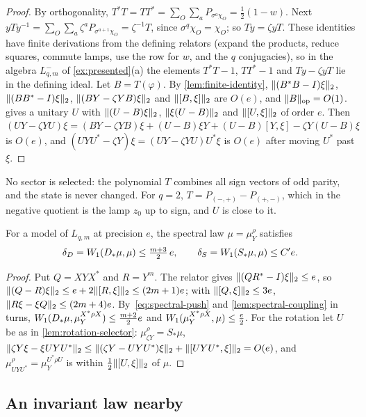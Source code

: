 \begin{proof}
By orthogonality, $T^*T=TT^*=\sum_O\sum_aP_{\sigma^a\chi_O}=\frac12(1-w)$. Next $yTy^{-1}=\sum_O\sum_a\zeta^aP_{\sigma^{a+1}\chi_O}=
\zeta^{-1}T$, since $\sigma^q\chi_O=\chi_O$; so $Ty=\zeta yT$. These identities have finite derivations from the defining
relators (expand the products, reduce squares, commute lamps, use the row for $w$, and the $q$ conjugacies), so in the
algebra $L_{q,m}^-$ of \cref{ex:presented}(a) the elements $T^*T-1$, $TT^*-1$ and $Ty-\zeta yT$ lie in the defining ideal.
Let $B=T(\varphi)$. By \cref{lem:finite-identity}, $\lVert (B^*B-I)\xi\rVert_2$, $\lVert (BB^*-I)\xi\rVert_2$, $\lVert (BY-\zeta YB)\xi\rVert_2$ and
$\lVert [B,\xi]\rVert_2$ are $O(e)$, and $\lVert B\rVert_{\mathrm{op}}=O(1)$.  gives a unitary $U$ with $\lVert (U-B)\xi\rVert_2$, $\lVert \xi(U-B)\rVert_2$ and
$\lVert [U,\xi]\rVert_2$ of order $e$. Then $(UY-\zeta YU)\xi=(BY-\zeta YB)\xi+(U-B)\xi Y+(U-B)[Y,\xi]-\zeta Y(U-B)\xi$ is $O(e)$, and
$(UYU^*-\zeta Y)\xi=(UY-\zeta YU)U^*\xi$ is $O(e)$ after moving $U^*$ past $\xi$.
\end{proof}

No sector is selected: the polynomial $T$ combines all sign vectors of odd parity, and the state is never changed. For
$q=2$, $T=P_{(-,+)}-P_{(+,-)}$, which in the negative quotient is the lamp $z_0$ up to sign, and $U$ is close to it.

\begin{lemma}\label{lem:invariances}
For a model of $L_{q,m}$ at precision $e$, the spectral law $\mu=\mu^\rho_Y$ satisfies
\[
\delta_D=W_1(D_*\mu,\mu)\le\tfrac{m+3}2\,e,\qquad\delta_S=W_1(S_*\mu,\mu)\le C'e .
\]
\end{lemma}

\begin{proof}
Put $Q=XYX^*$ and $R=Y^m$. The relator gives $\lVert (QR^*-I)\xi\rVert_2\le e$, so $\lVert (Q-R)\xi\rVert_2\le e+2\lVert [R,\xi]\rVert_2\le(2m+1)e$; with
$\lVert [Q,\xi]\rVert_2\le3e$, $\lVert R\xi-\xi Q\rVert_2\le(2m+4)e$. By~\eqref{eq:spectral-push} and \cref{lem:spectral-coupling} in turns,
$W_1(D_*\mu,\mu^{X^*\rho X}_Y)\le\frac{m+2}2e$ and $W_1(\mu^{X^*\rho X}_Y,\mu)\le\frac e2$. For the rotation let $U$ be as in
\cref{lem:rotation-selector}: $\mu^\rho_{\zeta Y}=S_*\mu$, $\lVert \zeta Y\xi-\xi UYU^*\rVert_2\le\lVert (\zeta Y-UYU^*)\xi\rVert_2+\lVert [UYU^*,\xi]\rVert_2=
O(e)$, and $\mu^\rho_{UYU^*}=\mu^{U^*\rho U}_Y$ is within $\frac12\lVert [U,\xi]\rVert_2$ of $\mu$.
\end{proof}

\subsection{An invariant law nearby}\label{sec:rates-shadow}

